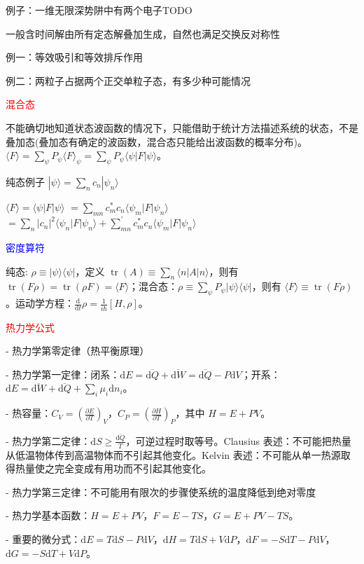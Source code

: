 \documentclass[a4paper,8pt]{extarticle} %
\newcommand{\bluetext}[1]{\textcolor{blue}{#1}}
\newcommand{\redtext}[1]{\textcolor{red}{#1}}
\begin{document}
\begin{multicols}{3}
例子：一维无限深势阱中有两个电子TODO

一般含时间解由所有定态解叠加生成，自然也满足交换反对称性

例一：等效吸引和等效排斥作用

例二：两粒子占据两个正交单粒子态，有多少种可能情况

\redtext{混合态}

不能确切地知道状态波函数的情况下，只能借助于统计方法描述系统的状态，不是叠加态(叠加态有确定的波函数，混合态只能给出波函数的概率分布)。$\langle F \rangle = \sum_{\psi} P_{\psi}\langle F \rangle_{\psi} = \sum_{\psi} P_{\psi} \langle\psi| F |\psi\rangle$。

纯态例子 $|\psi\rangle=\sum_{n}c_n|\psi_n\rangle$

$\langle F \rangle=\langle\psi|F|\psi\rangle$
$=\sum_{mn}c_m^*c_n\langle\psi_m|F|\psi_n\rangle$
$=\sum_n|c_n|^2\langle\psi_n|F|\psi_n\rangle+\sum_{mn}^\prime c_m^*c_n\langle\psi_m|F|\psi_n\rangle$

\bluetext{密度算符}

纯态: $\rho \equiv |\psi\rangle \langle\psi|$，定义 $\operatorname{tr}(A) \equiv \sum_{n}\langle n|A|n\rangle$，则有 $\operatorname{tr}(F\rho) = \operatorname{tr}(\rho F) = \langle F \rangle$；混合态：$\rho \equiv \sum_{\psi} P_{\psi}|\psi\rangle \langle\psi|$，则有 $\langle F \rangle \equiv \operatorname{tr}(F\rho)$。运动学方程：$\frac{\mathrm{d}}{\mathrm{d}t}\rho = \frac{1}{i\hbar}[H,\rho]$。

\redtext{热力学公式}

- 热力学第零定律（热平衡原理）

- 热力学第一定律：闭系：$\mathrm{d}E = \overline{\mathrm{d}Q} + \overline{\mathrm{d}W} = \overline{\mathrm{d}Q} - P\mathrm{d}V$；开系：$\mathrm{d}E = \overline{\mathrm{d}W} + \overline{\mathrm{d}Q} + \sum_i \mu_i\mathrm{d}n_i$。

- 热容量：$C_V = \left(\frac{\partial E}{\partial T}\right)_V$，$C_P = \left(\frac{\partial H}{\partial T}\right)_P$，其中 $H = E + PV$。

- 热力学第二定律：$\mathrm{d}S \geq \frac{\overline{\mathrm{d}Q}}{T}$，可逆过程时取等号。Clausius 表述：不可能把热量从低温物体传到高温物体而不引起其他变化。Kelvin 表述：不可能从单一热源取得热量使之完全变成有用功而不引起其他变化。

- 热力学第三定律：不可能用有限次的步骤使系统的温度降低到绝对零度

- 热力学基本函数：$H = E + PV$，$F = E - TS$，$G = E + PV - TS$。

- 重要的微分式：$\mathrm{d}E = T\mathrm{d}S-P\mathrm{d}V$，$\mathrm{d}H = T\mathrm{d}S+V\mathrm{d}P$，$\mathrm{d}F = -S\mathrm{d}T-P\mathrm{d}V$，$\mathrm{d}G = -S\mathrm{d}T + V\mathrm{d}P$。


\end{multicols}
\end{document}
